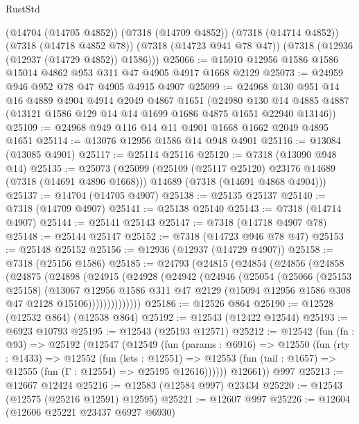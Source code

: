 \begin{lexlean}{RustStd}
\begin{coremodule}
      (@14704 (@14705 @4852))
      (@7318 (@14709 @4852))
      (@7318 (@14714 @4852))
      (@7318 (@14718 @4852 @78))
      (@7318 (@14723 @941 @78 @47))
      (@7318 (@12936 (@12937 (@14729 @4852)) @1586)))
@25066 := @15010 @12956 @1586 @1586 @15014 @4862 @953 @311 @47 @4905 @4917 @1668 @2129
@25073 := @24959 @946 @952 @78 @47 @4905 @4915 @4907
@25099 := @24968
    @130
    @951
    @14
    @16
    @4889
    @4904
    @4914
    @2049
    @4867
    @1651
    (@24980 @130 @14 @4885 @4887 (@13121 @1586 @129 @14 @14 @1699 @1686 @4875 @1651 @22940 @13146))
@25109 := @24968 @949 @116 @14 @11 @4901 @1668 @1662 @2049 @4895 @1651
@25114 := @13076 @12956 @1586 @14 @948 @4901
@25116 := @13084 (@13085 @4901)
@25117 := @25114 @25116
@25120 := @7318 (@13090 @948 @14)
@25135 := @25073
    (@25099
      (@25109 (@25117 @25120) @23176 @14689 (@7318 (@14691 @4896 @1668)))
      @14689
      (@7318 (@14691 @4868 @4904)))
@25137 := @14704 (@14705 @4907)
@25138 := @25135 @25137
@25140 := @7318 (@14709 @4907)
@25141 := @25138 @25140
@25143 := @7318 (@14714 @4907)
@25144 := @25141 @25143
@25147 := @7318 (@14718 @4907 @78)
@25148 := @25144 @25147
@25152 := @7318 (@14723 @946 @78 @47)
@25153 := @25148 @25152
@25156 := @12936 (@12937 (@14729 @4907))
@25158 := @7318 (@25156 @1586)
@25185 := @24793
    (@24815
      (@24854
        (@24856
          (@24858
            (@24875
              (@24898
                (@24915
                  (@24928
                    (@24942
                      (@24946
                        (@25054
                          (@25066
                            (@25153 @25158)
                            (@13067
                              @12956
                              @1586
                              @311
                              @47
                              @2129
                              (@15094 @12956 @1586 @308 @47 @2128 @15106))))))))))))))
@25186 := @12526 @864
@25190 := @12528 (@12532 @864) (@12538 @864)
@25192 := @12543 (@12422 @12544)
@25193 := @6923 @10793
@25195 := @12543 (@25193 @12571)
@25212 := @12542
    (fun (fn : @93) =>
    @25192
      (@12547
        (@12549
          (fun (params : @6916) =>
          @12550
            (fun (rty : @1433) =>
            @12552
              (fun (lets : @12551) =>
              @12553 (fun (tail : @1657) => @12555 (fun (Γ : @12554) => @25195 @12616))))))
        @12661))
    @997
@25213 := @12667 @12424
@25216 := @12583 (@12584 @997) @23434
@25220 := @12543 (@12575 (@25216 @12591) @12595)
@25221 := @12607 @997
@25226 := @12604 (@12606 @25221 @23437 @6927 @6930)

\end{coremodule}
\end{lexlean}
